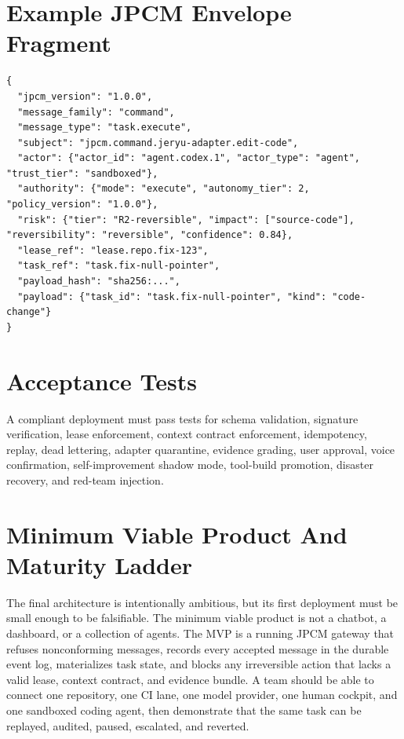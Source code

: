 \documentclass[10pt,journal,onecolumn]{IEEEtran}
\begin{document}
\section{Example JPCM Envelope Fragment}
\begin{lstlisting}
{
  "jpcm_version": "1.0.0",
  "message_family": "command",
  "message_type": "task.execute",
  "subject": "jpcm.command.jeryu-adapter.edit-code",
  "actor": {"actor_id": "agent.codex.1", "actor_type": "agent", "trust_tier": "sandboxed"},
  "authority": {"mode": "execute", "autonomy_tier": 2, "policy_version": "1.0.0"},
  "risk": {"tier": "R2-reversible", "impact": ["source-code"], "reversibility": "reversible", "confidence": 0.84},
  "lease_ref": "lease.repo.fix-123",
  "task_ref": "task.fix-null-pointer",
  "payload_hash": "sha256:...",
  "payload": {"task_id": "task.fix-null-pointer", "kind": "code-change"}
}
\end{lstlisting}

\section{Acceptance Tests}
A compliant deployment must pass tests for schema validation, signature verification, lease enforcement, context contract enforcement, idempotency, replay, dead lettering, adapter quarantine, evidence grading, user approval, voice confirmation, self-improvement shadow mode, tool-build promotion, disaster recovery, and red-team injection.


\section{Minimum Viable Product And Maturity Ladder}
The final architecture is intentionally ambitious, but its first deployment must be small enough to be falsifiable.  The minimum viable product is not a chatbot, a dashboard, or a collection of agents.  The MVP is a running JPCM gateway that refuses nonconforming messages, records every accepted message in the durable event log, materializes task state, and blocks any irreversible action that lacks a valid lease, context contract, and evidence bundle.  A team should be able to connect one repository, one CI lane, one model provider, one human cockpit, and one sandboxed coding agent, then demonstrate that the same task can be replayed, audited, paused, escalated, and reverted.
\end{document}
